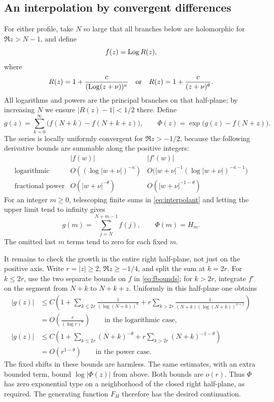 \documentclass[11pt,a4paper]{article}
\theoremstyle{remark}\newtheorem{remark}[theorem]{Remark}
\begin{document}
\subsection{An interpolation by convergent differences}
For either profile, take $N$ so large that all branches below are holomorphic
for $\Re z>N-1$, and define
\[
 f(z)=\operatorname{Log} R(z),
\]
where
\[
 R(z)=1+\frac{c}{(\operatorname{Log}(z+\nu))^\kappa}
 \quad\text{or}\quad
 R(z)=1+\frac{c}{(z+\nu)^\theta}.
\]
All logarithms and powers are the principal branches on that half-plane;
by increasing $N$ we ensure $|R(z)-1|<1/2$ there. Define
\begin{equation}\label{eq:interpolant}
 g(z)=\sum_{k=0}^{\infty}\bigl(f(N+k)-f(N+k+z)\bigr),\qquad
 \Phi(z)=\exp\bigl(g(z)-f(N+z)\bigr).
\end{equation}
The series is locally uniformly convergent for $\Re z>-1/2$, because the
following derivative bounds are summable along the positive integers:
\begin{equation}\label{eq:fbounds}
 \begin{array}{c|c|c}
 & |f(w)| & |f'(w)|\\ \hline
 \text{logarithmic} & O((\log|w+\nu|)^{-\kappa}) &
  O\bigl(|w+\nu|^{-1}(\log|w+\nu|)^{-\kappa-1}\bigr)\\[2pt]
 \text{fractional power} & O(|w+\nu|^{-\theta}) &
  O(|w+\nu|^{-1-\theta})
 \end{array}
\end{equation}
For an integer $m\ge0$, telescoping finite sums in \eqref{eq:interpolant}
and letting the upper limit tend to infinity gives
\[
 g(m)=\sum_{j=N}^{N+m-1}f(j),\qquad \Phi(m)=H_m.
\]
The omitted last $m$ terms tend to zero for each fixed $m$.

It remains to check the growth in the entire right half-plane, not just on
the positive axis. Write $r=|z|\ge2$, $\Re z\ge-1/4$, and split the sum
at $k=2r$. For $k\le2r$, use the two separate bounds on $f$ in
\eqref{eq:fbounds}; for $k>2r$, integrate $f'$ on the segment from
$N+k$ to $N+k+z$. Uniformly in this half-plane one obtains
\begin{align*}
 |g(z)|&\le C\left(1+
   \sum_{k\le2r}\frac1{(\log(N+k))^\kappa}
   +r\sum_{k>2r}\frac1{(N+k)(\log(N+k))^{\kappa+1}}\right)\\
 &=O\left(\frac r{(\log r)^\kappa}\right)
 \qquad\text{in the logarithmic case},\\
 |g(z)|&\le C\left(1+\sum_{k\le2r}(N+k)^{-\theta}
       +r\sum_{k>2r}(N+k)^{-1-\theta}\right)\\
 &=O(r^{1-\theta})\qquad\text{in the power case}.
\end{align*}
The fixed shifts in these bounds are harmless. The same estimates, with
an extra bounded term, bound $\log|\Phi(z)|$ from above. Both bounds are
$o(r)$. Thus $\Phi$ has zero exponential type on a neighborhood of the
closed right half-plane, as required. The generating function $F_H$
therefore has the desired continuation.
\end{document}
